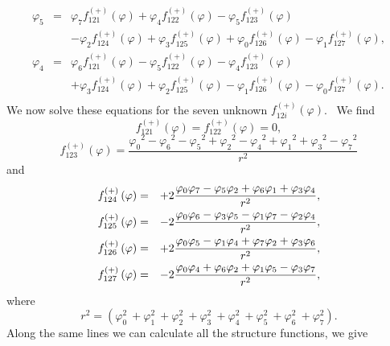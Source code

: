 \documentclass[a4paper,12pt]{book}
\begin{document}
\begin{eqnarray}
\varphi _{5} &=&\varphi _{7}f_{121}^{(+)}(\varphi )+\varphi
_{4}f_{122}^{(+)}(\varphi )-\varphi _{5}f_{123}^{(+)}(\varphi )  \nonumber \\
&&-\varphi _{2}f_{124}^{(+)}(\varphi )+\varphi _{3}f_{125}^{(+)}(\varphi
)+\varphi _{0}f_{126}^{(+)}(\varphi )-\varphi _{1}f_{127}^{(+)}(\varphi ), 
\nonumber \\
\varphi _{4} &=&\varphi _{6}f_{121}^{(+)}(\varphi )-\varphi
_{5}f_{122}^{(+)}(\varphi )-\varphi _{4}f_{123}^{(+)}(\varphi )  \nonumber \\
&&+\varphi _{3}f_{124}^{(+)}(\varphi )+\varphi _{2}f_{125}^{(+)}(\varphi
)-\varphi _{1}f_{126}^{(+)}(\varphi )-\varphi _{0}f_{127}^{(+)}(\varphi ). 
\nonumber \\
&&  \label{eqns}
\end{eqnarray}
We now solve these equations for the seven unknown $f_{12i}^{(+)}\left(
\varphi \right) $. \ We find 
\begin{equation}
f_{121}^{(+)}\left( \varphi \right) =f_{122}^{(+)}\left( \varphi \right) =0,
\end{equation}
\[
f_{123}^{(+)}\left( \varphi \right) ={\frac{{\varphi _{0}}^{2}-{\varphi _{6}}%
^{2}-{\varphi _{5}}^{2}+{\varphi _{2}}^{2}-{\varphi _{4}}^{2}+{\varphi _{1}}%
^{2}+{\varphi _{3}}^{2}-{\varphi _{7}}^{2}}{r^{2}}} 
\]
and 
\begin{eqnarray}
f_{124}^{(+)}\left( \varphi \right) &=&+2{\frac{{\varphi _{0}}{\varphi _{7}}-%
{\varphi _{5}}{\varphi _{2}}+{\varphi _{6}}{\varphi _{1}}+{\varphi _{3}}{%
\varphi _{4}}}{r^{2}},} \\
f_{125}^{(+)}\left( \varphi \right) &=&-2{\frac{{\varphi _{0}}{\varphi _{6}}-%
{\varphi _{3}}{\varphi _{5}}-{\varphi _{1}}{\varphi _{7}}-{\varphi _{2}}{%
\varphi _{4}}}{r^{2}},} \\
f_{126}^{(+)}\left( \varphi \right) &=&+2{\frac{{\varphi _{0}}{\varphi _{5}}-%
{\varphi _{1}}{\varphi _{4}}+{\varphi _{7}}{\varphi _{2}}+{\varphi _{3}}{%
\varphi _{6}}}{r^{2}},} \\
f_{127}^{(+)}\left( \varphi \right) &=&-2{\frac{{\varphi _{0}}{\varphi _{4}}+%
{\varphi _{6}}{\varphi _{2}}+{\varphi _{1}}{\varphi _{5}}-{\varphi _{3}}{%
\varphi _{7}}}{r^{2}},}
\end{eqnarray}
where 
\begin{equation}
r^{2}=(\varphi _{0}^{2}{\ +}\varphi _{1}^{2}{\ +}\varphi _{2}^{2}{\ +}%
\varphi _{3}^{2}{\ +}\varphi _{4}^{2}{\ +}\varphi _{5}^{2}{\ +}\varphi
_{6}^{2}{\ +}\varphi _{7}^{2}).
\end{equation}
Along the same lines we can calculate all the structure functions, we give
\end{document}
